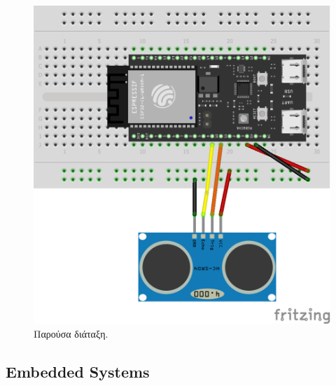 \begin{figure}[h!]
\centering
\includegraphics[scale=0.3]{images/introduction/thesis_schematic.png}
\caption{Παρούσα διάταξη.}
 \label{fig:schematic}
\end{figure}

\subsection{Embedded Systems}

